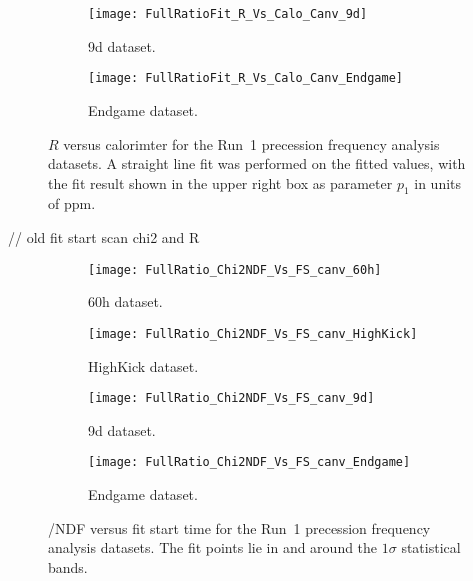 \begin{landscape}
\begin{figure}[]
\begin{minipage}[t]{0.48\linewidth}
    \begin{subfigure}[]{0.5\linewidth}
        \centering
        \texttt{[image: FullRatioFit\_R\_Vs\_Calo\_Canv\_9d]}
        \caption{9d dataset.}
    \end{subfigure}%
    \begin{subfigure}[]{0.5\linewidth}
        \centering
        \texttt{[image: FullRatioFit\_R\_Vs\_Calo\_Canv\_Endgame]}
        \caption{Endgame dataset.}
    \end{subfigure}
\captionsetup{width=0.9\linewidth}
\caption[$R$ versus calorimeter number]{$R$ versus calorimter for the Run~1 precession frequency analysis datasets. A straight line fit was performed on the fitted values, with the fit result shown in the upper right box as parameter $p_{1}$ in units of ppm.}
\label{fig:caloFits_R}
\end{minipage}
\end{figure}
\end{landscape}



// old fit start scan chi2 and R


\begin{figure}[]
\centering
    \begin{subfigure}[]{0.45\textwidth}
        \centering
        \texttt{[image: FullRatio\_Chi2NDF\_Vs\_FS\_canv\_60h]}
        \caption{60h dataset.}
    \end{subfigure}%
    \begin{subfigure}[]{0.45\textwidth}
        \centering
        \texttt{[image: FullRatio\_Chi2NDF\_Vs\_FS\_canv\_HighKick]}
        \caption{HighKick dataset.}
    \end{subfigure}

    \begin{subfigure}[]{0.45\textwidth}
        \centering
        \texttt{[image: FullRatio\_Chi2NDF\_Vs\_FS\_canv\_9d]}
        \caption{9d dataset.}
    \end{subfigure}%
    \begin{subfigure}[]{0.45\textwidth}
        \centering
        \texttt{[image: FullRatio\_Chi2NDF\_Vs\_FS\_canv\_Endgame]}
        \caption{Endgame dataset.}
    \end{subfigure}
\caption[\chisq/NDF versus fit start time]{\chisq/NDF versus fit start time for the Run~1 precession frequency analysis datasets. The fit points lie in and around the $1\sigma$ statistical bands.}
\label{fig:fitStartTime_chi2}
\end{figure}


